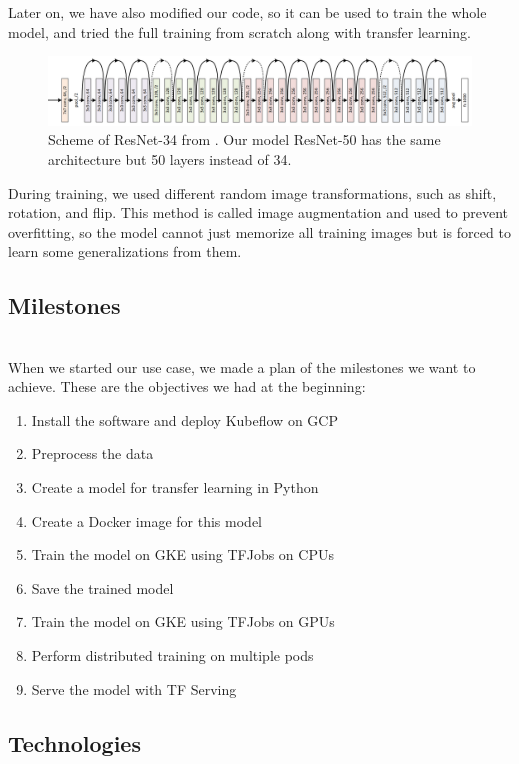 \documentclass[
	12pt, %
]{fphw}
\begin{document}
Later on, we have also modified our code, so it can be used to train the whole model, and tried the full training from scratch along with transfer learning.

\begin{figure}[H]
	\includegraphics[width=1\textwidth]{resnet.png}
	\caption{Scheme of ResNet-34 from \cite{resnet}. Our model ResNet-50 has the same architecture but 50 layers instead of 34.}
\end{figure}

During training, we used different random image transformations, such as shift, rotation, and flip. This method is called image augmentation and used to prevent overfitting, so the model cannot just memorize all training images but is forced to learn some generalizations from them.\\

\subsection*{Milestones}
\ \\  

When we started our use case, we made a plan of the milestones we want to achieve. These are the objectives we had at the beginning:
\begin{enumerate}
\item Install the software and deploy Kubeflow on GCP 
\item Preprocess the data
\item Create a model for transfer learning in Python
\item Create a Docker image for this model
\item Train the model on GKE using TFJobs on CPUs
\item Save the trained model
\item Train the model on GKE using TFJobs on GPUs
\item Perform distributed training on multiple pods
\item Serve the model with TF Serving
\end{enumerate}


\subsection*{Technologies}
\ \\ 
\end{document}
